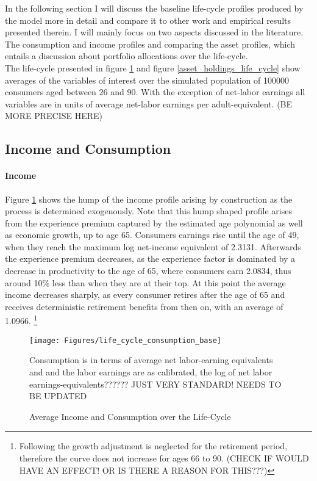 \documentclass[a4paper,12pt,legno]{article}
\begin{document}
In the following section I will discuss the baseline life-cycle profiles produced by the model more in detail and compare it to other work and empirical results presented therein. I will mainly focus on two aspects discussed in the literature. The consumption and income profiles and comparing the asset profiles, which entails a discussion about portfolio allocations over the life-cycle. \\
The life-cycle presented in figure \ref{consumption_life_cycle} and figure \ref{asset_holdings_life_cycle} show averages of the variables of interest over the simulated population of 100000 consumers aged between 26 and 90. With the exception of net-labor earnings all variables are in units of average net-labor earnings per adult-equivalent. (BE MORE PRECISE HERE) 

\subsection{Income and Consumption}

\paragraph{Income} Figure \ref{consumption_life_cycle} shows the hump of the income profile arising by construction as the process is determined exogenously. Note that this hump shaped profile arises from the experience premium captured by the estimated age polynomial as well as economic growth, up to age 65. Consumers earnings rise until the age of 49, when they reach the maximum log net-income equivalent of 2.3131. Afterwards the experience premium decreases, as the experience factor is dominated by a decrease in productivity to the age of 65, where consumers earn 2.0834, thus around 10\% less than when they are at their top. At this point the average income decreases sharply, as every consumer retires after the age of 65 and receives deterministic retirement benefits from then on, with an average of 1.0966. \footnote{Following \cite{hintermaier2011} the growth adjustment is neglected for the retirement period, therefore the curve does not increase for ages 66 to 90. (CHECK IF WOULD HAVE AN EFFECT! OR IS THERE A REASON FOR THIS???)} 

\begin{figure}[!htbp]
\caption{Average Income and Consumption over the Life-Cycle} 
\label{consumption_life_cycle}	%
\centering
\texttt{[image: Figures/life\_cycle\_consumption\_base]}  %

\begin{minipage}{0.8\linewidth}
\footnotesize{Consumption is in terms of average net labor-earning equivalents and and the labor earnings are as calibrated, the log of net labor earnings-equivalents?????? JUST VERY STANDARD! NEEDS TO BE UPDATED}
\end{minipage}

\end{figure}
\end{document}
